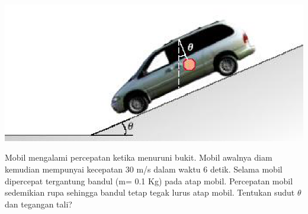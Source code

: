 \item 
\mbox{}
\begin{center}
\includegraphics [scale=0.7]{./latex/eps/1_5_7_image_1.eps}
\end{center}
Mobil mengalami percepatan ketika menuruni bukit. Mobil awalnya diam kemudian mempunyai kecepatan 30 m/s dalam waktu 6 detik. Selama mobil dipercepat tergantung bandul (m= 0.1 Kg) pada atap mobil. Percepatan mobil sedemikian rupa sehingga bandul tetap tegak lurus atap mobil. Tentukan sudut $\theta$ dan tegangan tali? 
